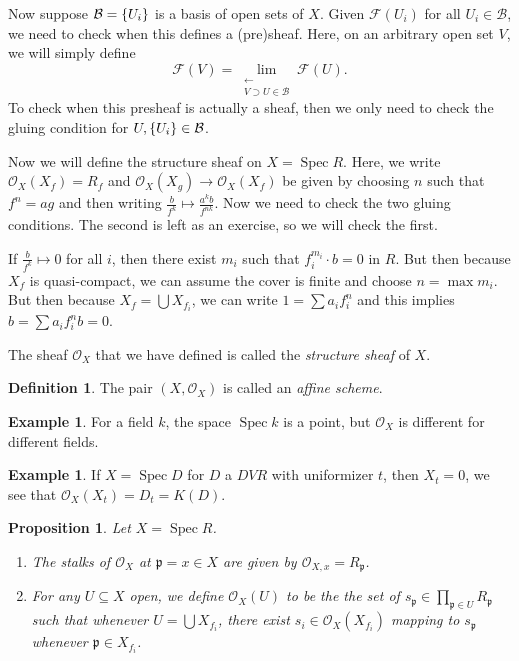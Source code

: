 \documentclass[leqno, openany]{memoir}
\newtheorem{prop}[thm]{Proposition}
\theoremstyle{definition}
\newtheorem{defn}[thm]{Definition}
\newtheorem{exm}[thm]{Example}
\theoremstyle{remark}
\theoremstyle{plain}
\theoremstyle{definition}
\theoremstyle{remark}
\newcommand{\mc}[1]{\mathcal{#1}}
\newcommand{\mf}[1]{\mathfrak{#1}}
\DeclareMathOperator{\Spec}{Spec}
\begin{document}
Now suppose $\mc{B} = \qty{U_i}$ is a basis of open sets of $X$. Given $\mc{F}(U_i)$ for all $U_i \in \mc{B}$, we need to check when this defines a (pre)sheaf. Here, on an arbitrary open set $V$, we will simply define
\[ \mc{F}(V) = \lim_{\substack{\longleftarrow \\ V \supset U \in \mc{B}}} \mc{F}(U). \]
To check when this presheaf is actually a sheaf, then we only need to check the gluing condition for $U, \qty{U_i} \in \mathcal{B}$.

Now we will define the structure sheaf on $X = \Spec R$. Here, we write $\mc{O}_X(X_f) = R_f$ and $\mc{O}_X(X_g) \to \mc{O}_X(X_f)$ be given by choosing $n$ such that $f^n = ag$ and then writing $\frac{b}{f^k} \mapsto \frac{a^k b}{f^{nk}}$. Now we need to check the two gluing conditions. The second is left as an exercise, so we will check the first.

If $\frac{b}{f^k} \mapsto 0$ for all $i$, then there exist $m_i$ such that $f_i^{m_i} \cdot b = 0$ in $R$. But then because $X_f$ is quasi-compact, we can assume the cover is finite and choose $n = \max m_i$. But then because $X_f = \bigcup X_{f_i}$, we can write $1 = \sum a_i f_i^n$ and this implies $b = \sum a_i f_i^n b = 0$.

The sheaf $\mc{O}_X$ that we have defined is called the \textit{structure sheaf} of $X$.

\begin{defn}
    The pair $(X, \mc{O}_X)$ is called an \textit{affine scheme}. 
\end{defn}

\begin{exm}
    For a field $k$, the space $\Spec k$ is a point, but $\mc{O}_X$ is different for different fields.
\end{exm}

\begin{exm}
    If $X = \Spec D$ for $D$ a $DVR$ with uniformizer $t$, then $X_t = \qty{0}$, we see that $\mc{O}_X(X_t) = D_t = K(D)$.
\end{exm}

\begin{prop}
    Let $X = \Spec R$. 
    \begin{enumerate}
        \item The stalks of $\mc{O}_X$ at $\mf{p} = x \in X$ are given by $\mc{O}_{X,x} = R_{\mf{p}}$.
        \item For any $U \subseteq X$ open, we define $\mc{O}_X(U)$ to be the the set of $s_{\mf{p}} \in \prod_{\mf{p} \in U} R_{\mf{p}}$ such that whenever $U = \bigcup X_{f_i}$, there exist $s_i \in \mc{O}_X(X_{f_i})$ mapping to $s_{\mf{p}}$ whenever $\mf{p} \in X_{f_i}$.
    \end{enumerate}
\end{prop}
\end{document}
